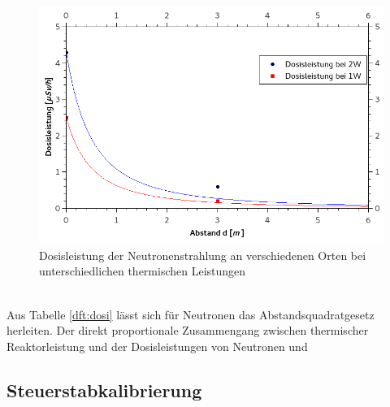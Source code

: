         \begin{figure}[H]
            \centering
            \includegraphics[scale=0.5]{pic/Neutronendosisleistung_Abstand}
            \caption{Dosisleistung der Neutronenstrahlung an verschiedenen Orten bei unterschiedlichen thermischen Leistungen}
            \label{df:neu_abstand}
        \end{figure}

    \ \\    
    Aus Tabelle \ref{dft:dosi} lässt sich für Neutronen das Abstandsquadratgesetz herleiten. Der direkt proportionale Zusammengang zwischen thermischer Reaktorleistung und der Dosisleistungen von Neutronen und 

    \subsection{Steuerstabkalibrierung}

